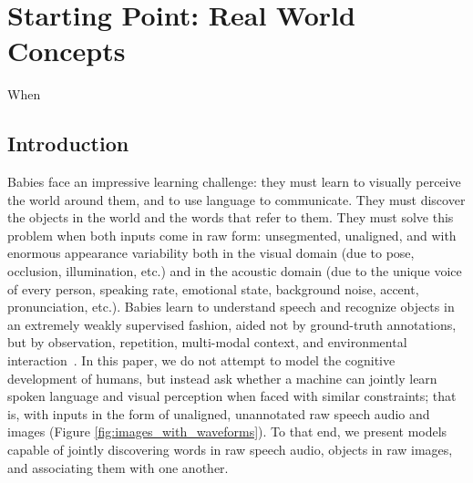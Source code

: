\chapter{Starting Point: Real World Concepts}
\label{chapter:starting_point}

When 

\section{Introduction}
Babies face an impressive learning challenge: they must learn to visually perceive the world around them, and to use language to communicate. They must discover the objects in the world and the words that refer to them. They must solve this problem when both inputs come in raw form: unsegmented, unaligned, and with enormous appearance variability both in the visual domain (due to pose, occlusion, illumination, etc.) and in the acoustic domain (due to the unique voice of every person, speaking rate, emotional state, background noise, accent, pronunciation, etc.). Babies learn to understand speech and recognize objects in an extremely weakly supervised fashion, aided not by ground-truth annotations, but by observation, repetition, multi-modal context, and environmental interaction~\cite{dupoux_2018,SPELKE199029}. In this paper, we do not attempt to model the cognitive development of humans, but instead ask whether a machine can jointly learn spoken language and visual perception when faced with similar constraints; that is, with inputs in the form of unaligned, unannotated raw speech audio and images (Figure \ref{fig:images_with_waveforms}). To that end, we present models capable of jointly discovering words in raw speech audio, objects in raw images, and associating them with one another.

